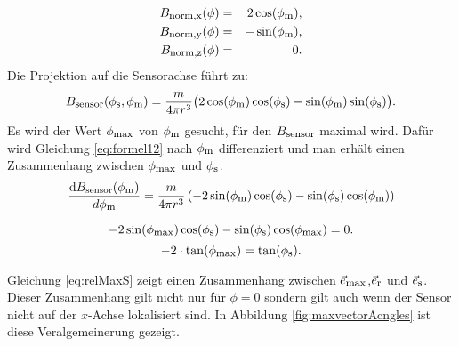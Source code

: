 \begin{eqnarray}
    B_{\textrm{\footnotesize{norm,x}}}(\phi) &=& 2  \cos(\phi_{\textrm{\footnotesize{m}}}),
    \label{eq:magNorm2DX}\\
    B_{\textrm{\footnotesize{norm,y}}}(\phi) &=& - \sin(\phi_{\textrm{\footnotesize{m}}}),
    \label{eq:magNorm2DY}\\
    B_{\textrm{\footnotesize{norm,z}}}(\phi) &=& 0.
    \label{eq:magNorm2DZ}\\
\end{eqnarray}
Die Projektion auf die Sensorachse führt zu:
\begin{equation}
    B_{\textrm{\footnotesize{sensor}}}(\phi_{\textrm{\footnotesize{s}}},\phi_{\textrm{\footnotesize{m}}})= \frac{ m }{4 \pi r^3} \big( 2  \cos(\phi_{\textrm{\footnotesize{m}}})  \cos(\phi_{\textrm{\footnotesize{s}}}) - \sin(\phi_{\textrm{\footnotesize{m}}})  \sin(\phi_{\textrm{\footnotesize{s}}}) \big).
    \label{eq:formel12}
\end{equation}
Es wird der Wert $\phi_{\textrm{\footnotesize{max}}}$ von $\phi_{\textrm{\footnotesize{m}}}$ gesucht, für den $B_{\textrm{\footnotesize{sensor}}}$ maximal wird. Dafür wird Gleichung \ref{eq:formel12} nach $\phi_{\textrm{\footnotesize{m}}}$ differenziert und man erhält einen Zusammenhang zwischen $\phi_{\textrm{\footnotesize{max}}}$ und $\phi_{\textrm{\footnotesize{s}}}$.
\begin{equation}
    \frac{\text{d}B_\text{sensor}(\phi_{\textrm{\footnotesize{m}}})}{d\phi_{\textrm{\footnotesize{m}}}}=\frac{ m }{4 \pi r^3}\left ( -2 \sin(\phi_{\textrm{\footnotesize{m}}})\cos(\phi_{\textrm{\footnotesize{s}}})-\sin(\phi_{\textrm{\footnotesize{s}}})  \cos(\phi_{\textrm{\footnotesize{m}}})\right )
    \label{eq:formel13}
\end{equation}

\begin{equation}
    -2 \sin(\phi_{\textrm{\footnotesize{max}}})\cos(\phi_{\textrm{\footnotesize{s}}})-\sin(\phi_{\textrm{\footnotesize{s}}})  \cos(\phi_{\textrm{\footnotesize{max}}}) = 0.
\end{equation}
\begin{equation}
    -2\cdot\tan(\phi_{\textrm{\footnotesize{max}}})= \tan(\phi_{\textrm{\footnotesize{s}}}).
    \label{eq:relMaxS}
\end{equation}
    
    Gleichung \ref{eq:relMaxS} zeigt einen Zusammenhang zwischen $\vec{e}_{\textrm{\footnotesize{max}}}$,$\vec{e}_{\textrm{\footnotesize{r}}}$ und $\vec{e}_{\textrm{\footnotesize{s}}}$. Dieser Zusammenhang gilt nicht nur für $\phi = 0$ sondern gilt auch wenn der Sensor nicht auf der $x$-Achse lokalisiert sind. In Abbildung \ref{fig:maxvectorAcngles} ist diese Veralgemeinerung gezeigt. 
    
